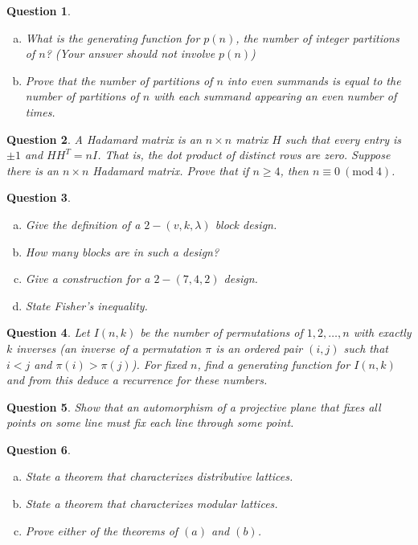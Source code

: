 \documentclass[12]{article}
\newcommand{\Mod}[1]{\ (\mathrm{mod}\ #1)}
\newtheorem{question}{Question}
\theoremstyle{definition}
\begin{document}
	\begin{question}
		\
		\begin{enumerate}[a)]
			\item What is the generating function for $p(n)$, the number of integer partitions of $n$? (Your answer should not involve $p(n)$)
			\item Prove that the number of partitions of $n$ into even summands is equal to the number of partitions of $n$ with each summand appearing an even number of times.
		\end{enumerate}
	\end{question}

	\begin{question}
		A Hadamard matrix is an $n \times n$ matrix $H$ such that every entry is $\pm 1$ and $HH^T = nI$.  That is, the dot product of distinct rows are zero.  Suppose there is an $n \times n$ Hadamard matrix.  Prove that if $n \geq 4$, then $n \equiv 0 \Mod{4}$.
	\end{question}

	\begin{question}
		\
		\begin{enumerate}[a)]
			\item Give the definition of a $2-(v,k,\lambda)$ block design.
			\item How many blocks are in such a design?
			\item Give a construction for a $2-(7,4,2)$ design.
			\item State Fisher's inequality.
		\end{enumerate}
	\end{question}

	\begin{question}
		Let $I(n,k)$ be the number of permutations of $1, 2, \ldots, n$ with exactly $k$ inverses (an inverse of a permutation $\pi$ is an ordered pair $(i,j)$ such that $i < j$ and $\pi(i) > \pi(j)$).  For fixed $n$, find a generating function for $I(n,k)$ and from this deduce a recurrence for these numbers.
	\end{question}

	\begin{question}
		Show that an automorphism of a projective plane that fixes all points on some line must fix each line through some point.
	\end{question}

	\begin{question}
		\
		\begin{enumerate}[a)]
			\item State a theorem that characterizes distributive lattices.
			\item State a theorem that characterizes modular lattices.
			\item Prove either of the theorems of $(a)$ and $(b)$.
		\end{enumerate}
	\end{question}
	
\end{document}
